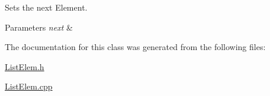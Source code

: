 Sets the next Element. 


\begin{DoxyParams}{Parameters}
{\em next} & \\
\hline
\end{DoxyParams}


The documentation for this class was generated from the following files\+:\begin{DoxyCompactItemize}
\item 
\hyperlink{_list_elem_8h}{List\+Elem.\+h}\item 
\hyperlink{_list_elem_8cpp}{List\+Elem.\+cpp}\end{DoxyCompactItemize}
